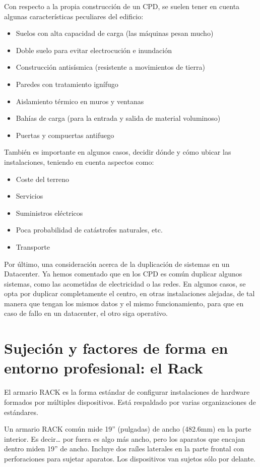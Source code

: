 \documentclass{article}
\begin{document}
Con respecto a la propia construcción de un CPD, se suelen tener en cuenta algunas características peculiares del edificio:
\begin{itemize}
\item Suelos con alta capacidad de carga (las máquinas pesan mucho)
\item Doble suelo para evitar electrocución e inundación
\item Construcción antisísmica (resistente a movimientos de tierra)
\item Paredes con tratamiento ignífugo
\item Aislamiento térmico en muros y ventanas
\item Bahías de carga (para la entrada y salida de material voluminoso)
\item Puertas y compuertas antifuego
\end{itemize}

También es importante en algunos casos, decidir dónde y cómo ubicar las instalaciones, teniendo en cuenta aspectos como:
\begin{itemize}
\item Coste del terreno
\item Servicios
\item Suministros eléctricos
\item Poca probabilidad de catástrofes naturales, etc.
\item Transporte
\end{itemize}


Por último, una consideración acerca de la duplicación de sistemas en un Datacenter. Ya hemos comentado que en los CPD es común duplicar algunos sistemas, como las acometidas de electricidad o las redes. En algunos casos, se opta por duplicar completamente el centro, en otras instalaciones alejadas, de tal manera que tengan los mismos datos y el mismo funcionamiento, para que en caso de fallo en un datacenter, el otro siga operativo.

\section{Sujeción y factores de forma en entorno profesional: el Rack}
\label{sec:orgdb08fb7}
El armario RACK es la forma estándar de configurar instalaciones de hardware formados por múltiples dispositivos. Está respaldado por varias organizaciones de estándares.

Un armario RACK común mide 19” (pulgadas) de ancho (482.6mm) en la parte interior. Es decir\ldots{} por fuera es algo más ancho, pero los aparatos que encajan dentro miden 19” de ancho. Incluye dos raíles laterales en la parte frontal con perforaciones para sujetar aparatos. Los dispositivos van sujetos sólo por delante.
\end{document}
